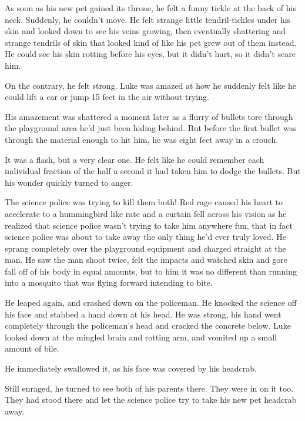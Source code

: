As soon as his new pet gained its throne, he felt a funny tickle at
the back of his neck. Suddenly, he couldn't move. He felt strange
little tendril-tickles under his skin and looked down to see his
veins growing, then eventually shattering and strange tendrils of
skin that looked kind of like his pet grew out of them instead. He
could see his skin rotting before his eyes, but it didn't hurt, so
it didn't scare him.



On the contrary, he felt strong. Luke was amazed at how he suddenly
felt like he could lift a car or jump 15 feet in the air without
trying.



His amazement was shattered a moment later as a flurry of bullets
tore through the playground area he'd just been hiding behind. But
before the first bullet was through the material enough to hit him,
he was eight feet away in a crouch.



It was a flash, but a very clear one. He felt like he could
remember each individual fraction of the half a second it had taken
him to dodge the bullets. But his wonder quickly turned to
anger.



The science police was trying to kill them both! Red rage caused
his heart to accelerate to a hummingbird like rate and a curtain
fell across his vision as he realized that science police wasn't
trying to take him anywhere fun, that in fact science police was
about to take away the only thing he'd ever truly loved. He sprang
completely over the playground equipment and charged straight at
the man. He saw the man shoot twice, felt the impacts and watched
skin and gore fall off of his body in equal amounts, but to him it
was no different than running into a mosquito that was flying
forward intending to bite.



He leaped again, and crashed down on the policeman. He knocked the
science off his face and stabbed a hand down at his head. He was
strong, his hand went completely through the policeman's head and
cracked the concrete below. Luke looked down at the mingled brain
and rotting arm, and vomited up a small amount of bile.



He immediately swallowed it, as his face was covered by his
headcrab.



Still enraged, he turned to see both of his parents there. They
were in on it too. They had stood there and let the science police
try to take his new pet headcrab away.



